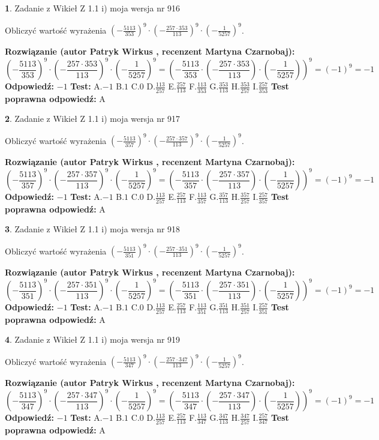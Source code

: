 \documentclass[12pt, a4paper]{article}
\theoremstyle{definition} %
\newtheorem{zad}{}
\newcommand{\zadStart}[1]{\begin{zad}#1\newline}
\newcommand{\zadStop}{\end{zad}}
\newcommand{\rozwStart}[2]{\noindent \textbf{Rozwiązanie (autor #1 , recenzent #2): }\newline}
\newcommand{\rozwStop}{\newline}
\newcommand{\odpStart}{\noindent \textbf{Odpowiedź:}\newline}
\newcommand{\odpStop}{\newline}
\newcommand{\testStart}{\noindent \textbf{Test:}\newline}
\newcommand{\testStop}{\newline}
\newcommand{\kluczStart}{\noindent \textbf{Test poprawna odpowiedź:}\newline}
\newcommand{\kluczStop}{\newline}
\begin{document}
\zadStart{Zadanie z Wikieł Z 1.1 i) moja wersja nr 916}

Obliczyć wartość wyrażenia $(-\frac{5113}{353})^{9} \cdot (-\frac{257 \cdot 353}{113})^{9} \cdot (-\frac{1}{5257})^{9}$.
\zadStop
\rozwStart{Patryk Wirkus}{Martyna Czarnobaj}
$$(-\frac{5113}{353})^{9} \cdot (-\frac{257 \cdot 353}{113})^{9} \cdot (-\frac{1}{5257})^{9} = (-\frac{5113}{353} \cdot (-\frac{257 \cdot 353}{113}) \cdot (-\frac{1}{5257}))^{9} = (-1)^{9} = -1$$
\rozwStop
\odpStart
$-1$
\odpStop
\testStart
A.$-1$ B.$1$ C.$0$ D.$\frac{113}{257}$ E.$\frac{257}{113}$
F.$\frac{113}{353}$ G.$\frac{353}{113}$
H.$\frac{353}{257}$
I.$\frac{257}{353}$
\testStop
\kluczStart
A
\kluczStop



\zadStart{Zadanie z Wikieł Z 1.1 i) moja wersja nr 917}

Obliczyć wartość wyrażenia $(-\frac{5113}{357})^{9} \cdot (-\frac{257 \cdot 357}{113})^{9} \cdot (-\frac{1}{5257})^{9}$.
\zadStop
\rozwStart{Patryk Wirkus}{Martyna Czarnobaj}
$$(-\frac{5113}{357})^{9} \cdot (-\frac{257 \cdot 357}{113})^{9} \cdot (-\frac{1}{5257})^{9} = (-\frac{5113}{357} \cdot (-\frac{257 \cdot 357}{113}) \cdot (-\frac{1}{5257}))^{9} = (-1)^{9} = -1$$
\rozwStop
\odpStart
$-1$
\odpStop
\testStart
A.$-1$ B.$1$ C.$0$ D.$\frac{113}{257}$ E.$\frac{257}{113}$
F.$\frac{113}{357}$ G.$\frac{357}{113}$
H.$\frac{357}{257}$
I.$\frac{257}{357}$
\testStop
\kluczStart
A
\kluczStop



\zadStart{Zadanie z Wikieł Z 1.1 i) moja wersja nr 918}

Obliczyć wartość wyrażenia $(-\frac{5113}{351})^{9} \cdot (-\frac{257 \cdot 351}{113})^{9} \cdot (-\frac{1}{5257})^{9}$.
\zadStop
\rozwStart{Patryk Wirkus}{Martyna Czarnobaj}
$$(-\frac{5113}{351})^{9} \cdot (-\frac{257 \cdot 351}{113})^{9} \cdot (-\frac{1}{5257})^{9} = (-\frac{5113}{351} \cdot (-\frac{257 \cdot 351}{113}) \cdot (-\frac{1}{5257}))^{9} = (-1)^{9} = -1$$
\rozwStop
\odpStart
$-1$
\odpStop
\testStart
A.$-1$ B.$1$ C.$0$ D.$\frac{113}{257}$ E.$\frac{257}{113}$
F.$\frac{113}{351}$ G.$\frac{351}{113}$
H.$\frac{351}{257}$
I.$\frac{257}{351}$
\testStop
\kluczStart
A
\kluczStop



\zadStart{Zadanie z Wikieł Z 1.1 i) moja wersja nr 919}

Obliczyć wartość wyrażenia $(-\frac{5113}{347})^{9} \cdot (-\frac{257 \cdot 347}{113})^{9} \cdot (-\frac{1}{5257})^{9}$.
\zadStop
\rozwStart{Patryk Wirkus}{Martyna Czarnobaj}
$$(-\frac{5113}{347})^{9} \cdot (-\frac{257 \cdot 347}{113})^{9} \cdot (-\frac{1}{5257})^{9} = (-\frac{5113}{347} \cdot (-\frac{257 \cdot 347}{113}) \cdot (-\frac{1}{5257}))^{9} = (-1)^{9} = -1$$
\rozwStop
\odpStart
$-1$
\odpStop
\testStart
A.$-1$ B.$1$ C.$0$ D.$\frac{113}{257}$ E.$\frac{257}{113}$
F.$\frac{113}{347}$ G.$\frac{347}{113}$
H.$\frac{347}{257}$
I.$\frac{257}{347}$
\testStop
\kluczStart
A
\kluczStop
\end{document}
